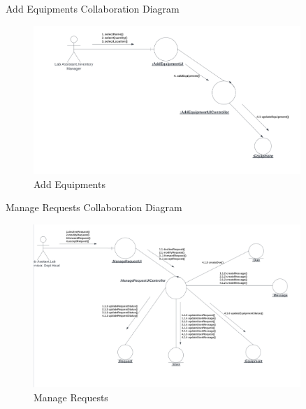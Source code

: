 \documentclass[20pt]{beamer}
\numberwithin{figure}{section}
\begin{document}
\begin{frame}{Add Equipments Collaboration Diagram}

     \begin{figure}
        \centering
        \includegraphics[width= 0.9\textwidth , height= 0.6\paperheight]{AddEquipmentsCollab.png}
        \caption{Add Equipments}
        \label{fig:22}
    \end{figure}

\end{frame}

\begin{frame}{Manage Requests Collaboration Diagram}

     \begin{figure}
        \centering
        \includegraphics[width= 0.9\textwidth , height= 0.6\paperheight]{ManageRequestCollab.png}
        \caption{Manage Requests}
        \label{fig:23}
    \end{figure}

\end{frame}
\end{document}
